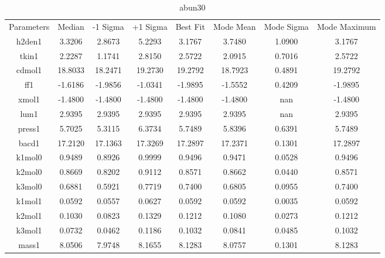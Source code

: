 \begin{table}
\caption{abun30}
\begin{tabular}{cccccccc}
Parameters & Median & -1 Sigma & +1 Sigma & Best Fit & Mode Mean & Mode Sigma & Mode Maximum \\
h2den1 & 3.3206 & 2.8673 & 5.2293 & 3.1767 & 3.7480 & 1.0900 & 3.1767 \\
tkin1 & 2.2287 & 1.1741 & 2.8150 & 2.5722 & 2.0915 & 0.7016 & 2.5722 \\
cdmol1 & 18.8033 & 18.2471 & 19.2730 & 19.2792 & 18.7923 & 0.4891 & 19.2792 \\
ff1 & -1.6186 & -1.9856 & -1.0341 & -1.9895 & -1.5552 & 0.4209 & -1.9895 \\
xmol1 & -1.4800 & -1.4800 & -1.4800 & -1.4800 & -1.4800 & nan & -1.4800 \\
lum1 & 2.9395 & 2.9395 & 2.9395 & 2.9395 & 2.9395 & nan & 2.9395 \\
press1 & 5.7025 & 5.3115 & 6.3734 & 5.7489 & 5.8396 & 0.6391 & 5.7489 \\
bacd1 & 17.2120 & 17.1363 & 17.3269 & 17.2897 & 17.2371 & 0.1301 & 17.2897 \\
k1mol0 & 0.9489 & 0.8926 & 0.9999 & 0.9496 & 0.9471 & 0.0528 & 0.9496 \\
k2mol0 & 0.8669 & 0.8202 & 0.9112 & 0.8571 & 0.8662 & 0.0440 & 0.8571 \\
k3mol0 & 0.6881 & 0.5921 & 0.7719 & 0.7400 & 0.6805 & 0.0955 & 0.7400 \\
k1mol1 & 0.0592 & 0.0557 & 0.0627 & 0.0592 & 0.0592 & 0.0035 & 0.0592 \\
k2mol1 & 0.1030 & 0.0823 & 0.1329 & 0.1212 & 0.1080 & 0.0273 & 0.1212 \\
k3mol1 & 0.0732 & 0.0462 & 0.1186 & 0.1032 & 0.0841 & 0.0485 & 0.1032 \\
mass1 & 8.0506 & 7.9748 & 8.1655 & 8.1283 & 8.0757 & 0.1301 & 8.1283 \\
\end{tabular}
\end{table}
